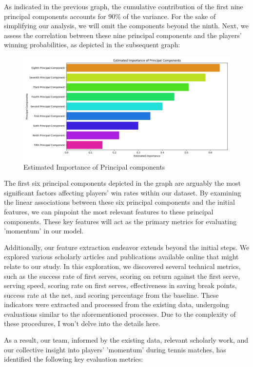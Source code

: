 \documentclass[12pt]{article}  %
\begin{document}
As indicated in the previous graph, the cumulative contribution of the first nine principal components accounts for 90\% of the variance. 
For the sake of simplifying our analysis, we will omit the components beyond the ninth. 
Next, we assess the correlation between these nine principal components and the players' winning probabilities, 
as depicted in the subsequent graph:
\begin{figure}[htbp]  %
    \centering  %
    \includegraphics[width=.7\textwidth]{3.png} %
    \caption{Estimated Importance of Principal components} %
\end{figure}

The first six principal components depicted in the graph are arguably the most significant factors affecting players' 
win rates within our dataset. By examining the linear associations between these six principal components and the initial features,
 we can pinpoint the most relevant features to these principal components. 
These key features will act as the primary metrics for evaluating 'momentum' in our model.

Additionally, our feature extraction endeavor extends beyond the initial steps. 
We explored various scholarly articles and publications available online that might relate to our study. 
In this exploration, we discovered several technical metrics, such as the success rate of first serves, 
scoring on return against the first serve, serving speed, scoring rate on first serves, effectiveness in saving break points, 
success rate at the net, and scoring percentage from the baseline. These indicators were extracted and processed from the existing data, 
undergoing evaluations similar to the aforementioned processes. 
Due to the complexity of these procedures, I won't delve into the details here.

As a result, our team, informed by the existing data, relevant scholarly work, 
and our collective insight into players' 'momentum' during tennis matches, 
has identified the following key evaluation metrics:
\end{document}

